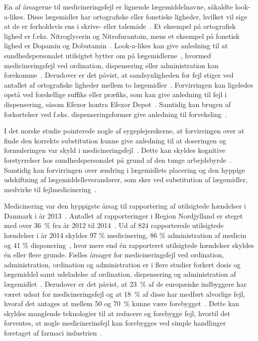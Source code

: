 En af årsagerne til medicineringsfejl er lignende lægemiddelnavne, såkaldte look-a-likes. Disse lægemidler har ortografiske eller fonetiske ligheder, hvilket vil sige at de er forholdsvis ens i skrive- eller talemåde~\citep{Garcia2017,Basco2016}. Et eksempel på ortografisk lighed er f.eks. Nitroglycerin og Nitrofurantoin, mens et eksempel på fonetisk lighed er Dopamin og Dobutamin~\citep{Basco2016}. Look-a-likes kan give anledning til at sundhedspersonalet utilsigtet bytter om på lægemidlerne~\citep{Lopes2012}, hvormed medicineringsfejl ved ordination, dispensering eller administration kan forekomme~\citep{Garcia2017,Lopes2012}. Derudover er det påvist, at sandsynligheden for fejl stiger ved antallet af ortografiske ligheder mellem to lægemidler~\citep{Basco2010}. 
Forvirringen kan ligeledes opstå ved forskellige suffiks eller præfiks, som kan give anledning til fejl i dispensering, såsom Efexor kontra Efexor Depot~\citep{DanskSelskabforPatientsikkerhed2009}. Samtidig kan brugen af forkortelser ved f.eks. dispenseringsformer give anledning til forveksling~\citep{Wittich2014}.

I det norske studie pointerede nogle af sygeplejerskerne, at forvirringen over at finde den korrekte substitution kunne give anledning til at doseringen og formuleringen var skyld i medicineringsfejl~\citep{Hakonsen2010}. Dette kan skyldes kognitive forstyrrelser hos sundhedspersonalet på grund af den tunge arbejdsbyrde~\citep{Wittich2014}. Samtidig kan forvirringen over ændring i lægemidlets placering og den hyppige udskiftning af lægemiddelleverandører, som sker ved substitution af lægemidler, medvirke til fejlmedicinering~\citep{Wittich2014}.

Medicinering var den hyppigste årsag til rapportering af utilsigtede hændelser i Danmark i år 2013~\citep{Patientombuddet2013}. Antallet af rapporteringer i Region Nordjylland er steget med over 36~\% fra år 2012 til 2014~\citep{Jensen2014}. Ud af 824 rapporterede utilsigtede hændelser i år 2014 skyldes 97 \% medicinering, 86 \% administration af medicin og 41 \% disponering~\citep{Jensen2014}, hvor mere end én rapporteret utilsigtede hændelser skyldes én eller flere grunde. Fælles årsager for medicineringsfejl ved ordination, administration, ordination og administration er i flere studier  forkert dosis og lægemiddel samt udeladelse af ordination, dispensering og administration af lægemidlet~\citep{Barker2002,Sundhedsstyrelsen2005,Lisby2005, Tully2009}.
Derudover er det påvist, at 23~\% af de europæiske indbyggere har været udsat for medicineringsfejl og at 18~\% af disse har medført alvorlige fejl, hvoraf det antages at mellem 50 og 70~\% kunne være forebygget~\citep{Garcia2017}. Dette kan skyldes manglende teknologier til at reducere og forebygge fejl, hvortil det forventes, at nogle medicinerinsfejl kan forebygges ved simple handlinger foretaget af farmaci industrien~\citep{Lopes2012}.

